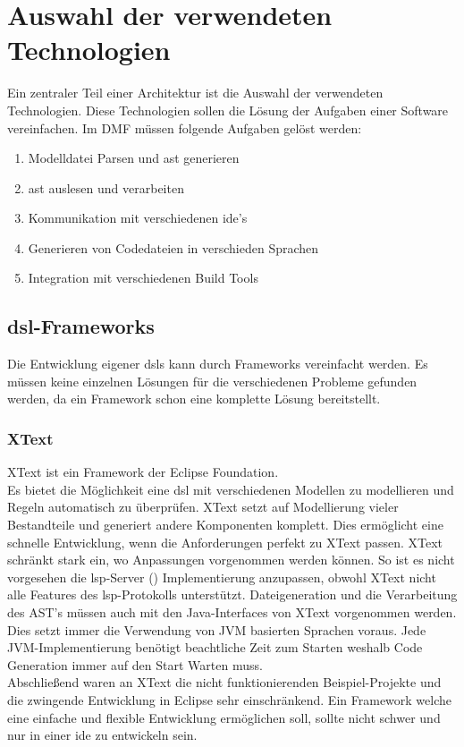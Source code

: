 \documentclass[./einleitung.tex]{subfiles}
\begin{document}
\section{Auswahl der verwendeten Technologien}\label{sec:auswahl-der-verwendeten-technologien}
Ein zentraler Teil einer Architektur ist die Auswahl der verwendeten Technologien.
Diese Technologien sollen die Lösung der Aufgaben einer Software vereinfachen.
\newline
Im DMF müssen folgende Aufgaben gelöst werden:
\begin{enumerate}
\item Modelldatei Parsen und \acrshort{ast} generieren
\item \acrshort{ast} auslesen und verarbeiten
\item Kommunikation mit verschiedenen \acrshort{ide}'s
\item Generieren von Codedateien in verschieden Sprachen
\item Integration mit verschiedenen Build Tools
\end{enumerate}

\subsection{\acrshort{dsl}-Frameworks}\label{subsec:dsl-frameworks}
Die Entwicklung eigener \acrshort{dsl}s kann durch Frameworks vereinfacht werden.
Es müssen keine einzelnen Lösungen für die verschiedenen Probleme gefunden werden, da ein Framework schon eine komplette Lösung bereitstellt.
\subsubsection{XText}
XText ist ein Framework der Eclipse Foundation.\\
Es bietet die Möglichkeit eine \acrfull{dsl} mit verschiedenen Modellen zu modellieren und Regeln automatisch zu überprüfen.
XText setzt auf Modellierung vieler Bestandteile und generiert andere Komponenten komplett.
Dies ermöglicht eine schnelle Entwicklung, wenn die Anforderungen perfekt zu XText passen.
XText schränkt stark ein, wo Anpassungen vorgenommen werden können.
So ist es nicht vorgesehen die \acrshort{lsp}-Server () Implementierung anzupassen, obwohl XText nicht alle Features des \acrlong{lsp}-Protokolls unterstützt.
Dateigeneration und die Verarbeitung des AST's müssen auch mit den Java-Interfaces von XText vorgenommen werden.
Dies setzt immer die Verwendung von JVM basierten Sprachen voraus.
Jede JVM-Implementierung benötigt beachtliche Zeit zum Starten weshalb Code Generation immer auf den Start Warten muss. \\
Abschließend waren an XText die nicht funktionierenden Beispiel-Projekte und die zwingende Entwicklung in Eclipse sehr einschränkend.
Ein Framework welche eine einfache und flexible Entwicklung ermöglichen soll, sollte nicht schwer und nur in einer \acrshort{ide} zu entwickeln sein.
\end{document}
